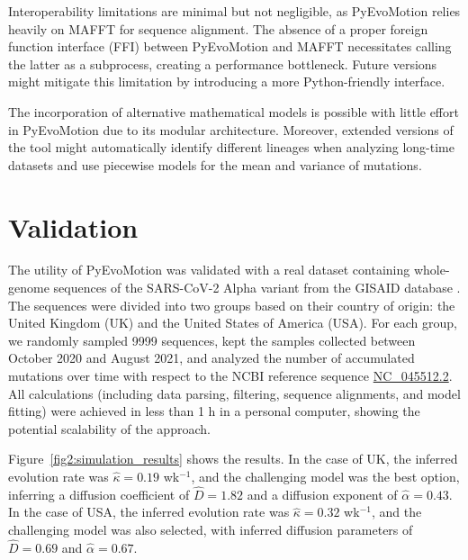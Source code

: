 Interoperability limitations are minimal but not negligible, as PyEvoMotion relies heavily on MAFFT for sequence alignment. The absence of a proper foreign function interface (FFI) between PyEvoMotion and MAFFT necessitates calling the latter as a subprocess, creating a performance bottleneck. Future versions might mitigate this limitation by introducing a more Python-friendly interface.

The incorporation of alternative mathematical models is possible with little effort in PyEvoMotion due to its modular architecture. Moreover, extended versions of the tool might automatically identify different lineages when analyzing long-time datasets and use piecewise models for the mean and variance of mutations.


\section{Validation}

The utility of PyEvoMotion was validated with a real dataset containing whole-genome sequences of the SARS-CoV-2 Alpha variant from the GISAID database \cite{khare2021}. The sequences were divided into two groups based on their country of origin: the United Kingdom (UK) and the United States of America (USA). For each group, we randomly sampled 9999 sequences, kept the samples collected between October 2020 and August 2021, and analyzed the number of accumulated mutations over time with respect to the NCBI reference sequence \href{https://www.ncbi.nlm.nih.gov/nuccore/1798174254}{NC\_045512.2}. All calculations (including data parsing, filtering, sequence alignments, and model fitting) were achieved in less than 1 h in a personal computer, showing the potential scalability of the approach. 

Figure~\ref{fig2:simulation_results} shows the results. In the case of UK, the inferred evolution rate was $\hat{\kappa}=0.19$ wk${^{-1}}$, and the challenging model was the best option, inferring a diffusion coefficient of $\hat{D}=1.82$ and a diffusion exponent of $\hat{\alpha}=0.43$. In the case of USA, the inferred evolution rate was $\hat{\kappa}=0.32$ wk${^{-1}}$, and the challenging model was also selected, with inferred diffusion parameters of $\hat{D}=0.69$ and $\hat{\alpha}=0.67$.

